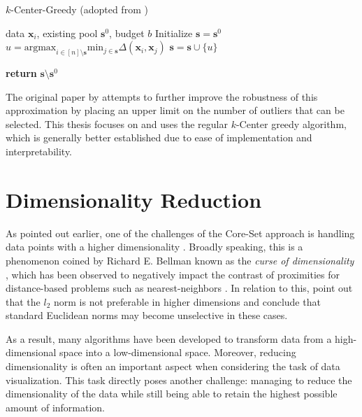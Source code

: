 \documentclass[english,bachelor,ul]{webisthesis} %
\begin{document}
\vspace{0.4\baselineskip}

\begin{algorithm}[htpb]
    \caption{$k$-Center-Greedy (adopted from \cite{DBLP:conf/iclr/SenerS18})}%
\label{alg:coreset}

\begin{algorithmic}

\Require data $ \mathbf{x}_i $, existing pool $ \mathbf{s}^0 $, budget $ b $
\State Initialize $ \mathbf{s} = \mathbf{s}^0 $
\Repeat
\State $ u = \text{argmax}_{i \in [n] \setminus \mathbf{s}} \text{min}_{j \in \mathbf{s}} \Delta(\mathbf{x}_i, \mathbf{x}_j) $
\State $ \mathbf{s} = \mathbf{s} \cup \{u\} $

\State \textbf{return} $\mathbf{s} \setminus \mathbf{s}^0 $
\end{algorithmic}
\end{algorithm}

\vspace{0.3\baselineskip}

The original paper by \cite{DBLP:conf/iclr/SenerS18} attempts to further improve the robustness of this approximation by placing an upper limit on the number of outliers that can be selected. This thesis focuses on and uses the regular $k$-Center greedy algorithm, which is generally better established due to ease of implementation and interpretability.

\section{Dimensionality Reduction}

As pointed out earlier, one of the challenges of the Core-Set approach is handling data points with a higher dimensionality \citep{DBLP:conf/iccv/SinhaED19}. Broadly speaking, this is a phenomenon coined by Richard E. Bellman known as the \textit{curse of dimensionality} \citep{Freimer1961AdaptiveCP}, which has been observed to negatively impact the contrast of proximities for distance-based problems such as nearest-neighbors \citep{DBLP:conf/icdt/BeyerGRS99, DBLP:books/lib/HastieTF09}. In relation to this, \cite{DBLP:conf/icdt/AggarwalHK01} point out that the $ l_2 $ norm is not preferable in higher dimensions and \cite{DBLP:conf/iwann/VerleysenF05} conclude that standard Euclidean norms may become unselective in these cases.

As a result, many algorithms have been developed to transform data from a high-dimensional space into a low-dimensional space. Moreover, reducing dimensionality is often an important aspect when considering the task of data visualization. This task directly poses another challenge: managing to reduce the dimensionality of the data while still being able to retain the highest possible amount of information. 
\end{document}

